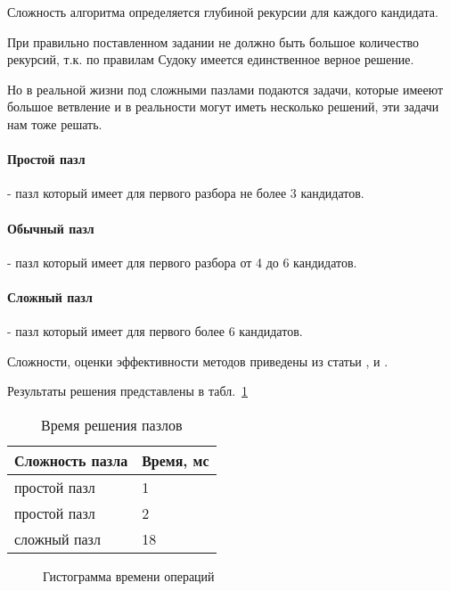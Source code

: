 Сложность алгоритма определяется глубиной рекурсии для каждого кандидата.

При правильно поставленном задании не должно быть большое количество рекурсий, т.к. по правилам Судоку имеется единственное верное решение. 

Но в реальной жизни под сложными пазлами подаются задачи, которые имееют большое ветвление и в реальности могут иметь несколько решений, эти задачи нам тоже решать.

\paragraph{Простой пазл} - пазл который имеет для первого разбора не более 3 кандидатов.

\paragraph{Обычный пазл} - пазл который имеет для первого разбора от 4 до 6 кандидатов.

\paragraph{Сложный пазл} - пазл который имеет для первого более 6 кандидатов.

Сложности, оценки эффективности методов приведены из статьи \cite{sudoku1}, \cite{sudoku2} и \cite{sudoku3}.

Результаты решения представлены в табл.~\ref{tab:tres2}

\begin{table}[ht]
  \caption{Время решения пазлов}
  \begin{tabular}{|p{9cm}|p{5.5cm}|}
  \hline
  Сложность пазла & Время, мс \\
  \hline
  простой пазл & 1\\
  \hline
  простой пазл & 2\\
  \hline
  сложный пазл & 18\\
  \hline
  \end{tabular}
  \label{tab:tres2}
\end{table}


\begin{figure}[ht]
 \centering
 \caption{Гистограмма времени операций}
 \label{fig:ChDD1}
\end{figure}

